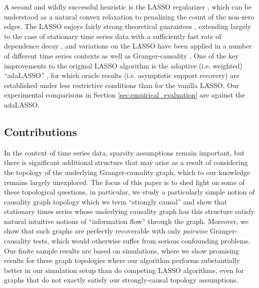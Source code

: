 \documentclass[12pt]{article}
\begin{document}
A second and wildly successful heuristic is the LASSO regularizer
\cite{tibshirani1996regression}, which can be understood as a natural
convex relaxation to penalizing the count of the non-zero edges.  The
LASSO enjoys fairly strong theoretical guarantees
\cite{wainwright2009sharp}, extending largely to the case of
stationary time series data with a sufficiently fast rate of
dependence decay \cite{basu2015} \cite{wong2016lasso}
\cite{autoregressive_process_modelling_via_the_lasso_procedure}, and
variations on the LASSO have been applied in a number of different
time series contexts as well as Granger-causality
\cite{DBLP:journals/corr/HallacPBL17} \cite{haufe2008sparse}
\cite{bolstad2011causal} \cite{he2013stationary}
\cite{grouped_graphical_granger_modelling_for_gene_expression_regulatory_networks_discovery}.
One of the key improvements to the original LASSO algorithm is the
adaptive (i.e. weighted) ``adaLASSO'' \cite{adaptive_lasso_zou2006},
for which oracle results (i.e. asymptotic support recovery) are
established under less restrictive conditions than for the vanilla
LASSO.  Our experimental comparisons in Section
\ref{sec:empirical_evaluation} are against the
adaLASSO. %

\subsection{Contributions}
In the context of time series data, sparsity assumptions remain
important, but there is significant additional structure that may
arise as a result of considering the topology of the underlying
Granger-causality graph, which to our knowledge remains largely
unexplored.  The focus of this paper is to shed light on some of these
topological questions, in particular, we study a particularly simple
notion of causality graph topology which we term ``strongly causal''
and show that stationary times series whose underlying causality graph
has this structure satisfy natural intuitive notions of ``information
flow'' through the graph.  Moreover, we show that such graphs are
perfectly recoverable with only \textit{pairwise} Granger-causality
tests, which would otherwise suffer from serious confounding problems.
Our finite sample results are based on simulations, where we show
promising results for these graph topologies where our algorithm
performs substantially better in our simulation setup than do
competing LASSO algorithms, even for graphs that do not exactly
satisfy our strongly-causal topology assumptions.
\end{document}
